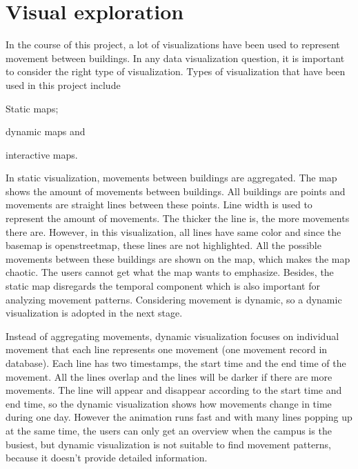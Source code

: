 \section{Visual exploration}
In the course of this project, a lot of visualizations have been used to represent movement between buildings. In any data visualization question, it is important to consider the right type of visualization. Types of visualization that have been used in this project include \begin {enumerate*} [label=\itshape\arabic*\upshape),font={\color{red!0!black}\bfseries}] \item Static maps; \item dynamic maps and \item interactive maps. \end {enumerate*}

In static visualization, movements between buildings are aggregated. The map shows the amount of movements between buildings. All buildings are points and movements are straight lines between these points. Line width is used to represent the amount of movements. The thicker the line is, the more movements there are. However, in this visualization, all lines have same color and since the basemap is openstreetmap, these lines are not highlighted. All the possible movements between these buildings are shown on the map, which makes the map chaotic. The users cannot get what the map wants to emphasize. Besides, the static map disregards the temporal component which is also important for analyzing movement patterns. Considering movement is dynamic, so a dynamic visualization is adopted in the next stage.

Instead of aggregating movements, dynamic visualization focuses on individual movement that each line represents one movement (one movement record in database). Each line has two timestamps, the start time and the end time of the movement. All the lines overlap and the lines will be darker if there are more movements. The line will appear and disappear according to the start time and end time, so the dynamic visualization shows how movements change in time during one day. However the animation runs fast and with many lines popping up at the same time, the users can only get an overview when the campus is the busiest, but dynamic visualization is not suitable to find movement patterns, because it doesn't provide detailed information.

